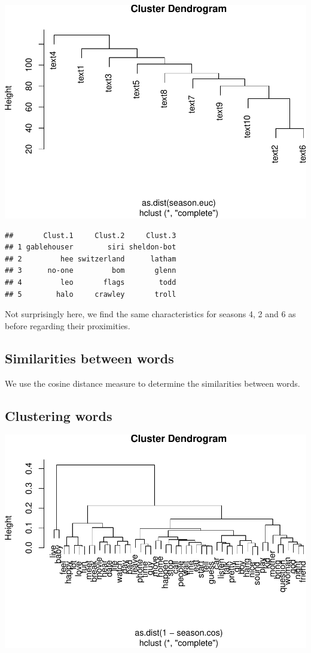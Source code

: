 \documentclass[
]{article}
\begin{document}
\includegraphics{report_files/figure-latex/unnamed-chunk-52-1.pdf}

\begin{verbatim}
##       Clust.1     Clust.2     Clust.3
## 1 gablehouser        siri sheldon-bot
## 2         hee switzerland      latham
## 3      no-one         bom       glenn
## 4         leo       flags        todd
## 5        halo     crawley       troll
\end{verbatim}

Not surprisingly here, we find the same characteristics for seasons 4, 2
and 6 as before regarding their proximities.

\hypertarget{similarities-between-words}{%
\subsection{Similarities between
words}\label{similarities-between-words}}

We use the cosine distance measure to determine the similarities between
words.

\hypertarget{clustering-words}{%
\subsection{Clustering words}\label{clustering-words}}

\includegraphics{report_files/figure-latex/unnamed-chunk-54-1.pdf}
\end{document}
